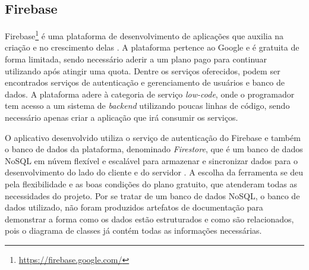 \subsection{Firebase}
\label{firebase}

Firebase\footnote{\url{https://firebase.google.com/}} é uma plataforma de desenvolvimento de aplicações que auxilia na criação e no crescimento delas \cite{firebase}. A plataforma pertence ao Google e é gratuita de forma limitada, sendo necessário aderir a um plano pago para continuar utilizando após atingir uma quota. Dentre os serviços oferecidos, podem ser encontrados serviços de autenticação e gerenciamento de usuários e banco de dados. A plataforma adere à categoria de serviço \textit{low-code}, onde o programador tem acesso a um sistema de \textit{backend} utilizando poucas linhas de código, sendo necessário apenas criar a aplicação que irá consumir os serviços.

O aplicativo desenvolvido utiliza o serviço de autenticação do Firebase e também o banco de dados da plataforma, denominado \textit{Firestore}, que é um banco de dados NoSQL em núvem flexível e escalável para armazenar e sincronizar dados para o desenvolvimento do lado do cliente e do servidor \cite{firestore}. A escolha da ferramenta se deu pela flexibilidade e as boas condições do plano gratuito, que atenderam todas as necessidades do projeto. Por se tratar de um banco de dados NoSQL, o banco de dados utilizado, não foram produzidos artefatos de documentação para demonstrar a forma como os dados estão estruturados e como são relacionados, pois o diagrama de classes já contém todas as informações necessárias. 
